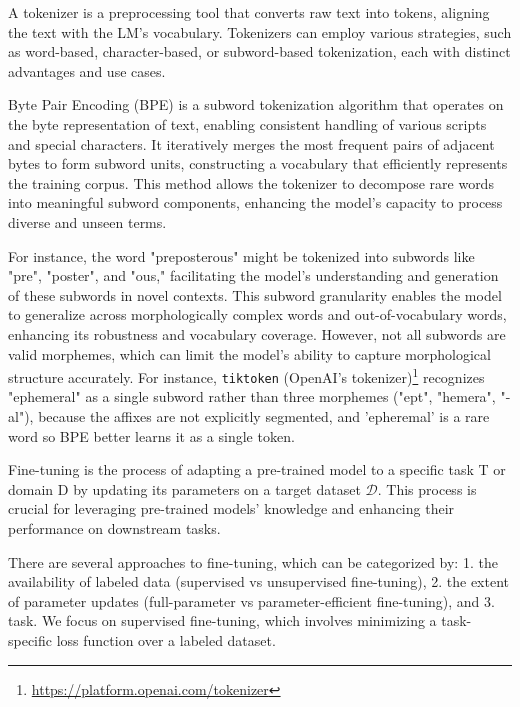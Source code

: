 A tokenizer is a preprocessing tool that converts raw text into tokens, aligning the text with the LM's vocabulary. Tokenizers can employ various strategies, such as word-based, character-based, or subword-based tokenization, each with distinct advantages and use cases.

Byte Pair Encoding (BPE) is a subword tokenization algorithm that operates on the byte representation of text, enabling consistent handling of various scripts and special characters. It iteratively merges the most frequent pairs of adjacent bytes to form subword units, constructing a vocabulary that efficiently represents the training corpus. This method allows the tokenizer to decompose rare words into meaningful subword components, enhancing the model's capacity to process diverse and unseen terms.

For instance, the word "preposterous" might be tokenized into subwords like "pre", "poster", and "ous," facilitating the model's understanding and generation of these subwords in novel contexts. This subword granularity enables the model to generalize across morphologically complex words and out-of-vocabulary words, enhancing its robustness and vocabulary coverage. However, not all subwords are valid morphemes, which can limit the model's ability to capture morphological structure accurately. For instance, \texttt{tiktoken} (OpenAI's tokenizer)\footnote{\href{https://platform.openai.com/tokenizer}{https://platform.openai.com/tokenizer}} recognizes "ephemeral" as a single subword rather than three morphemes ("ept", "hemera", "-al"), because the affixes are not explicitly segmented, and 'epheremal' is a rare word so BPE better learns it as a single token.

 \label{app:finetuning}
Fine-tuning is the process of adapting a pre-trained model to a specific task T or domain D by updating its parameters on a target dataset \(\mathcal{D}\). This process is crucial for leveraging pre-trained models' knowledge and enhancing their performance on downstream tasks.

There are several approaches to fine-tuning, which can be categorized by: 1. the availability of labeled data (supervised vs unsupervised fine-tuning), 2. the extent of parameter updates (full-parameter vs parameter-efficient fine-tuning), and 3. task. We focus on supervised fine-tuning, which involves minimizing a task-specific loss function over a labeled dataset.

\label{app:sft}

